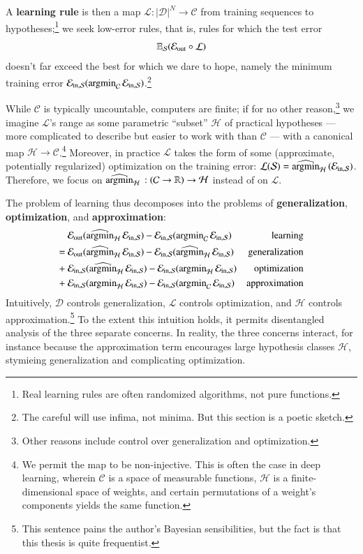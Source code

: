\documentclass[openany, notitlepage, justified]{tufte-book}
\theoremstyle{plain}
\theoremstyle{definition}
\newcommand{\Cc}{\mathcal{C}}   \newcommand{\CC}{\mathbb{C}}
\newcommand{\Dd}{\mathcal{D}}
\newcommand{\Hh}{\mathcal{H}}
\newcommand{\Ll}{\mathcal{L}}
\newcommand{\Ss}{\mathcal{S}}
\begin{document}
        \newpage
        A \textbf{learning rule} is then a
        map $\Ll:|\Dd|^N\to \Cc$ from training sequences to hypotheses;\footnote{
            Real learning rules are often randomized algorithms, not
            pure functions.
        } we seek low-error rules, that is, rules for which the test error
        $$
            \EE_{\Ss}(\Eout \circ \Ll)
        $$
        doesn't far exceed the best for which we dare to hope, namely the
        minimum training error $\Ein(\amC\Ein)$.\footnote{
            The careful will use infima, not minima.  But this section is
            a poetic sketch.
        }

        While $\Cc$ is typically uncountable, computers are finite; if for no
        other reason,\footnote{
            Other reasons include control over generalization and optimization.
        }
        we imagine $\Ll$'s range as some parametric ``subset'' $\Hh$ of
        practical hypotheses --- more complicated to describe but easier to
        work with than $\Cc$ ---  with a canonical map $\Hh \to \Cc$.\footnote{
            We permit the map to be non-injective.  This is often the case in
            deep learning, wherein $\Cc$ is a space of measurable functions,
            $\Hh$ is a finite-dimensional space of weights, and certain
            permutations of a weight's components yields the same function.
        } Moreover, in practice $\Ll$ takes the form of
        some (approximate, potentially regularized) optimization on the
        training error: $\Ll(\Ss) = \optH(\Ein)$.  Therefore, we focus on
        $\optH:(\Cc\to\RR)\to \Hh$ instead of on $\Ll$.

        The problem of learning thus decomposes into the problems of
        \textbf{generalization}, \textbf{optimization}, and
        \textbf{approximation}:
        \begin{align*}
             &~\Eout(\optH\Ein) - \Ein(\amC\Ein)    & \text{learning}       \\
            =&~\Eout(\optH\Ein) - \Ein(\optH\Ein)   & \text{generalization} \\ 
            +&~ \Ein(\optH\Ein) - \Ein(\amH\Ein)    & \text{optimization}   \\ 
            +&~ \Ein(\amH\Ein)  - \Ein(\amC\Ein)    & \text{approximation}    
        \end{align*}
           Intuitively,
            $\Dd$ controls generalization,
            $\Ll$ controls   optimization, 
        and $\Hh$ controls  approximation.\footnote{
            This sentence pains the author's Bayesian sensibilities, but the 
            fact is that this thesis is quite frequentist.
        } To the extent this intuition holds,
        it permits disentangled analysis of the three separate concerns.
        In reality, the three concerns interact, for instance because
        the approximation term encourages large hypothesis classes $\Hh$,
        stymieing generalization and complicating optimization. 
\end{document}
